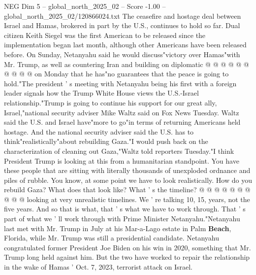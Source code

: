 \begin{textsample}{NEG Dim 5 – global\_north\_2025\_02 – Score -1.00 – global\_north\_2025\_02/120866024.txt}
The ceasefire and hostage deal between Israel and Hamas, brokered in part by the U.S., continues to hold so far.
Dual citizen Keith Siegel was the first American to be released since the implementation began last month, although other Americans have been released before.
On Sunday, Netanyahu said he would discuss"victory over Hamas"with Mr.
Trump, as well as countering Iran and building on diplomatic @ @ @ @ @ @ @ @ @ @ on Monday that he has"no guarantees that the peace is going to hold."The president ' s meeting with Netanyahu being his first with a foreign leader signals how the Trump White House views the U.S.-Israel relationship."Trump is going to continue his support for our great ally, Israel,"national security adviser Mike Waltz said on Fox News Tuesday.
Waltz said the U.S. and Israel have"more to go"in terms of returning Americans held hostage.
And the national security adviser said the U.S. has to think"realistically"about rebuilding Gaza."I would push back on the characterization of cleaning out Gaza,"Waltz told reporters Tuesday."I think President Trump is looking at this from a humanitarian standpoint.
You have these people that are sitting with literally thousands of unexploded ordnance and piles of rubble.
You know, at some point we have to look realistically.
How do you rebuild Gaza?
What does that look like?
What ' s the timeline? @ @ @ @ @ @ @ @ @ @ looking at very unrealistic timelines.
We ' re talking 10, 15, years, not the five years.
And so that is what, that ' s what we have to work through.
That ' s part of what we ' ll work through with Prime Minister Netanyahu."Netanyahu last met with Mr.
Trump in July at his Mar-a-Lago estate in Palm \textbf{Beach}, Florida, while Mr.
Trump was still a presidential candidate.
Netanyahu congratulated former President Joe Biden on his win in 2020, something that Mr.
Trump long held against him.
But the two have worked to repair the relationship in the wake of Hamas ' Oct. 7, 2023, terrorist attack on Israel.

\end{textsample}
